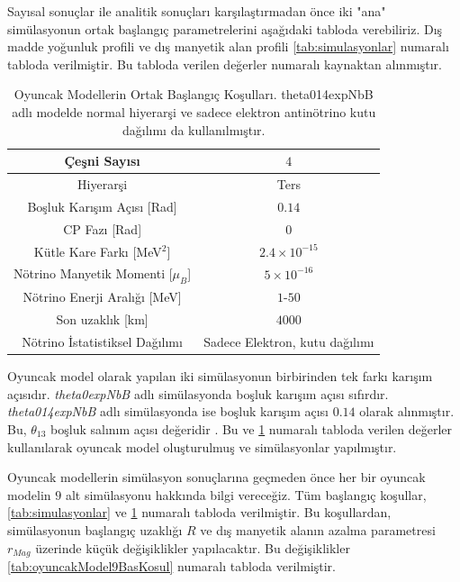 Sayısal sonuçlar ile analitik sonuçları karşılaştırmadan önce iki "ana" simülasyonun ortak başlangıç parametrelerini aşağıdaki tabloda verebiliriz. Dış madde yoğunluk profili ve dış manyetik alan profili \ref{tab:simulasyonlar} numaralı tabloda verilmiştir. Bu tabloda verilen değerler \cite{ParticleDataGroup:2018ovx} numaralı kaynaktan alınmıştır.
\begin{table}[hbt!]
    \centering
    \begin{tabular}{|c|c|}
        \hline Çeşni Sayısı & $4$ \\
        \hline Hiyerarşi & Ters \\
        \hline Boşluk Karışım Açısı [Rad]& $0.14$ \\
        \hline CP Fazı [Rad] & $ 0 $ \\
        \hline Kütle Kare Farkı [MeV$^{2}$] & $2.4 \times 10^{-15}$ \\
        \hline Nötrino Manyetik Momenti [$ \mu_{B} $] & $ 5\times10^{-16} $ \\
        \hline Nötrino Enerji Aralığı [MeV] & $1$-$50$  \\
        \hline Son uzaklık [km] & $4000$ \\
        \hline Nötrino İstatistiksel Dağılımı & Sadece Elektron, kutu dağılımı  \\
        \hline
    \end{tabular}
    \caption[Oyuncak Modellerin Ortak Başlangıç Koşulları.]{\label{tab:oyuncakModOrtakBasKos}Oyuncak Modellerin Ortak Başlangıç Koşulları. theta014expNbB adlı modelde normal hiyerarşi ve sadece elektron antinötrino kutu dağılımı da kullanılmıştır.}
\end{table}

Oyuncak model olarak yapılan iki simülasyonun birbirinden tek farkı karışım açısıdır. \emph{theta0expNbB} adlı simülasyonda boşluk karışım açısı sıfırdır. \emph{theta014expNbB} adlı simülasyonda ise boşluk karışım açısı $ 0.14 $ olarak alınmıştır. Bu, $\theta_{13} $ boşluk salınım açısı değeridir \cite{ParticleDataGroup:2018ovx}. Bu ve \ref{tab:oyuncakModOrtakBasKos} numaralı tabloda verilen değerler kullanılarak oyuncak model oluşturulmuş ve simülasyonlar yapılmıştır.

Oyuncak modellerin simülasyon sonuçlarına geçmeden önce her bir oyuncak modelin $ 9 $ alt simülasyonu hakkında bilgi vereceğiz. Tüm başlangıç koşullar, \ref{tab:simulasyonlar} ve \ref{tab:oyuncakModOrtakBasKos} numaralı tabloda verilmiştir. Bu koşullardan, simülasyonun başlangıç uzaklığı $ R $ ve dış manyetik alanın azalma parametresi $ r_{Mag} $ üzerinde küçük değişiklikler yapılacaktır. Bu değişiklikler \ref{tab:oyuncakModel9BasKosul} numaralı tabloda verilmiştir.

